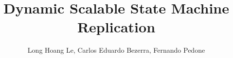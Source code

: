 \documentclass{llncs}
\begin{document}
\title{Dynamic Scalable State Machine Replication}

\author{Long Hoang Le,  Carlos Eduardo Bezerra, Fernando Pedone}


\maketitle
%






\newpage

{}
\newpage
\end{document}
